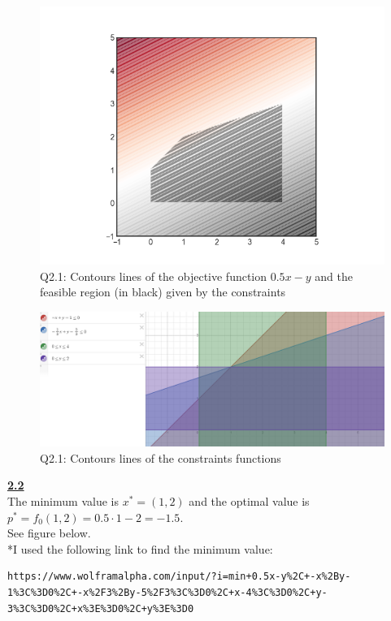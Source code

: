 \documentclass[fleqn]{article}
\begin{document}
\begin{figure}[h!]
\includegraphics[width=0.8\linewidth]{q2_1.PNG}
\caption{Q2.1: Contours lines of the objective function $0.5x-y$ and the feasible region (in black) given by the constraints}
\end{figure}

\begin{figure}[h!]
\includegraphics[width=0.8\linewidth]{q2_1_constraints_contours.PNG}
\caption{Q2.1: Contours lines of the constraints functions}
\end{figure}


\underline{\textbf{2.2}} \\
The minimum value is $x^* = (1,2)$ and the optimal value is $p^* = f_0(1,2) = 0.5 \cdot 1 -2 = -1.5$. \\
See figure below.\\

*I used the following link to find the minimum value: \\
\begin{lstlisting}[breaklines]
https://www.wolframalpha.com/input/?i=min+0.5x-y%2C+-x%2By-1%3C%3D0%2C+-x%2F3%2By-5%2F3%3C%3D0%2C+x-4%3C%3D0%2C+y-3%3C%3D0%2C+x%3E%3D0%2C+y%3E%3D0
\end{lstlisting} 
\end{document}
